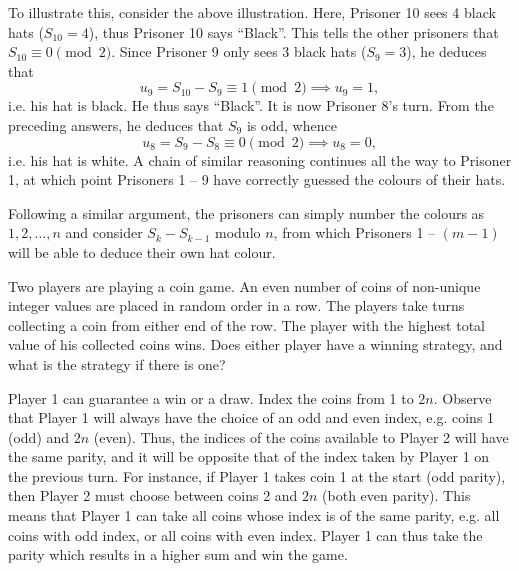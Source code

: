 \begin{solution}
\begin{ppart}
        To illustrate this, consider the above illustration. Here, Prisoner 10 sees 4 black hats ($S_{10} = 4$), thus Prisoner 10 says ``Black''. This tells the other prisoners that $S_{10} \equiv 0 \pmod{2}$. Since Prisoner 9 only sees 3 black hats ($S_9 = 3$), he deduces that \[u_9 = S_{10} - S_{9} \equiv 1 \pmod{2} \implies u_9 = 1,\] i.e. his hat is black. He thus says ``Black''. It is now Prisoner 8's turn. From the preceding answers, he deduces that $S_9$ is odd, whence \[u_8 = S_{9} - S_{8} \equiv 0 \pmod{2} \implies u_8 = 0,\] i.e. his hat is white. A chain of similar reasoning continues all the way to Prisoner 1, at which point Prisoners 1 -- 9 have correctly guessed the colours of their hats.
    \end{ppart}
    \begin{ppart}
        Following a similar argument, the prisoners can simply number the colours as $1, 2, \dots, n$ and consider $S_{k} - S_{k-1}$ modulo $n$, from which Prisoners 1 -- $(m-1)$ will be able to deduce their own hat colour.
    \end{ppart}
\end{solution}

\begin{problem}
    Two players are playing a coin game. An even number of coins of non-unique integer values are placed in random order in a row. The players take turns collecting a coin from either end of the row. The player with the highest total value of his collected coins wins. Does either player have a winning strategy, and what is the strategy if there is one?
\end{problem}
\begin{solution}
    Player 1 can guarantee a win or a draw. Index the coins from 1 to $2n$. Observe that Player 1 will always have the choice of an odd and even index, e.g. coins 1 (odd) and $2n$ (even). Thus, the indices of the coins available to Player 2 will have the same parity, and it will be opposite that of the index taken by Player 1 on the previous turn. For instance, if Player 1 takes coin 1 at the start (odd parity), then Player 2 must choose between coins 2 and $2n$ (both even parity). This means that Player 1 can take all coins whose index is of the same parity, e.g. all coins with odd index, or all coins with even index. Player 1 can thus take the parity which results in a higher sum and win the game.
\end{solution}